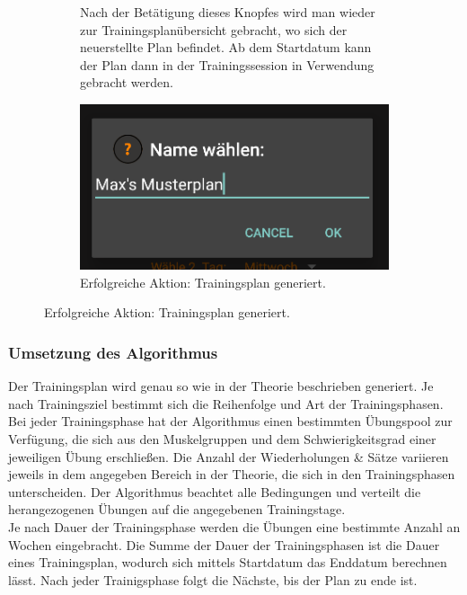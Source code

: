 \documentclass[FIPLY_base.tex]{subfiles}
\begin{document}
	\begin{figure}[H]
		\begin{subfigure}[b]{0.4\textwidth}
			Nach der Betätigung dieses Knopfes wird man wieder zur Trainingsplanübersicht gebracht, wo sich der neuerstellte Plan befindet. Ab dem Startdatum kann der Plan dann in der Trainingssession in Verwendung gebracht werden.
			\newline
		\end{subfigure}
		\hfil
		\begin{subfigure}[b]{0.5\textwidth}
			\includegraphics[scale=0.5]{img/plannameinput}
			\caption{Erfolgreiche Aktion: Trainingsplan generiert.}
		\end{subfigure}
	\end{figure}
	\subsubsection{Umsetzung des Algorithmus}
	Der Trainingsplan wird genau so wie in der Theorie beschrieben generiert. Je nach Trainingsziel bestimmt sich die Reihenfolge und Art der Trainingsphasen. Bei jeder Trainingsphase hat der Algorithmus einen bestimmten Übungspool zur Verfügung, die sich aus den Muskelgruppen und dem Schwierigkeitsgrad einer jeweiligen Übung erschließen. Die Anzahl der Wiederholungen \& Sätze variieren jeweils in dem angegeben Bereich in der Theorie, die sich in den Trainingsphasen unterscheiden. Der Algorithmus beachtet alle Bedingungen und verteilt die herangezogenen Übungen auf die angegebenen Trainingstage. 
	\ \\
	Je nach Dauer der Trainingsphase werden die Übungen eine bestimmte Anzahl an Wochen eingebracht. Die Summe der Dauer der Trainingsphasen ist die Dauer eines Trainingsplan, wodurch sich mittels Startdatum das Enddatum berechnen lässt. Nach jeder Trainigsphase folgt die Nächste, bis der Plan zu ende ist. 
\end{document}
